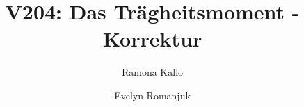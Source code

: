 

\title{V204: Das Trägheitsmoment - Korrektur}
\author{Ramona Kallo \and Evelyn Romanjuk}
\maketitle 
\newpage



\nocite{*}
\printbibliography


